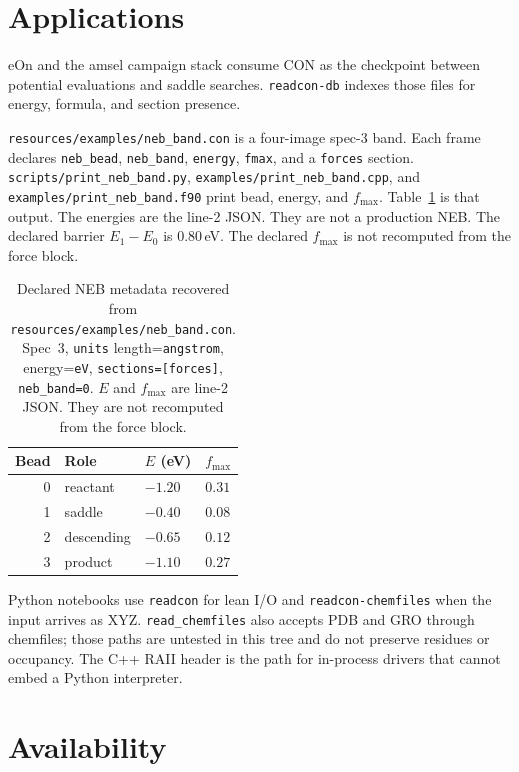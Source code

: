 \documentclass[preprint,12pt]{elsarticle}
\begin{document}
\section{Applications}

eOn and the amsel campaign stack consume CON as the checkpoint
between potential evaluations and saddle searches.
\texttt{readcon-db} indexes those files for energy, formula, and
section presence.

\texttt{resources/examples/neb\_band.con} is a four-image spec-3
band. Each frame declares \texttt{neb\_bead}, \texttt{neb\_band},
\texttt{energy}, \texttt{fmax}, and a \texttt{forces} section.
\texttt{scripts/print\_neb\_band.py},
\texttt{examples/print\_neb\_band.cpp}, and
\texttt{examples/print\_neb\_band.f90} print bead, energy, and
$f_{\max}$. Table~\ref{tab:neb} is that output. The energies are
the line-2 JSON. They are not a production NEB. The declared
barrier $E_1-E_0$ is $0.80$\,eV. The declared $f_{\max}$ is not
recomputed from the force block.

\begin{table}[ht]
\centering
\caption{Declared NEB metadata recovered from
\texttt{resources/examples/neb\_band.con}. Spec~3, \texttt{units}
length=\texttt{angstrom}, energy=\texttt{eV},
\texttt{sections=[forces]}, \texttt{neb\_band=0}. $E$ and
$f_{\max}$ are line-2 JSON. They are not recomputed from the force
block.}
\label{tab:neb}
\begin{tabular}{@{}rlll@{}}
\toprule
Bead & Role & $E$ (eV) & $f_{\max}$ \\
\midrule
0 & reactant & $-1.20$ & $0.31$ \\
1 & saddle   & $-0.40$ & $0.08$ \\
2 & descending & $-0.65$ & $0.12$ \\
3 & product  & $-1.10$ & $0.27$ \\
\bottomrule
\end{tabular}
\end{table}

Python notebooks use \texttt{readcon} for lean I/O and
\texttt{readcon-chemfiles} when the input arrives as XYZ.
\texttt{read\_chemfiles} also accepts PDB and GRO through chemfiles;
those paths are untested in this tree and do not preserve residues
or occupancy. The C++ RAII header is the path for in-process drivers
that cannot embed a Python interpreter.

\section{Availability}
\end{document}
